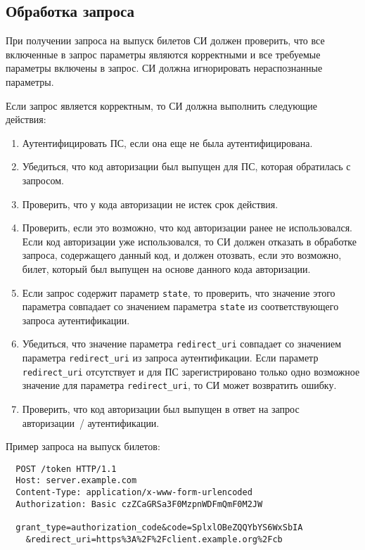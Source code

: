 \label{REQRESP.Token}

\subsection{Обработка запроса}\label{REQRESP.Token.Req}

При получении запроса на выпуск билетов СИ должен проверить, что все включенные в
запрос параметры являются корректными и все требуемые параметры включены в
запрос.
%
СИ должна игнорировать нераспознанные параметры.

Если запрос является корректным, то СИ должна выполнить следующие действия:
\begin{enumerate}
\item 
Аутентифицировать ПС, если она еще не была аутентифицирована.

\item 
Убедиться, что код авторизации был выпущен для ПС, которая обратилась с 
запросом.

\item Проверить, что у кода авторизации не истек срок действия.

\item Проверить, если это возможно, что код авторизации ранее 
не использовался. Если код авторизации уже использовался, 
то СИ должен отказать в обработке запроса, содержащего данный код, 
и должен отозвать, если это возможно, билет, 
который был выпущен на основе данного кода авторизации.

\item Если запрос содержит параметр \lstinline{state},
то проверить, что значение этого параметра совпадает со значением 
параметра \lstinline{state} из соответствующего запроса аутентификации.

\item Убедиться, что значение параметра \lstinline{redirect_uri} совпадает 
со значением параметра \lstinline{redirect_uri} из запроса аутентификации. 
Если параметр \lstinline{redirect_uri} отсутствует и для ПС
зарегистрировано только одно возможное значение 
для параметра \lstinline{redirect_uri}, то СИ может возвратить ошибку.

\item  
Проверить, что код авторизации был выпущен в ответ на запрос авторизации~/ 
аутентификации. 
\end{enumerate}

Пример запроса на выпуск билетов:
\begin{lstlisting}
  POST /token HTTP/1.1
  Host: server.example.com
  Content-Type: application/x-www-form-urlencoded
  Authorization: Basic czZCaGRSa3F0MzpnWDFmQmF0M2JW

  grant_type=authorization_code&code=SplxlOBeZQQYbYS6WxSbIA
    &redirect_uri=https%3A%2F%2Fclient.example.org%2Fcb
\end{lstlisting}

